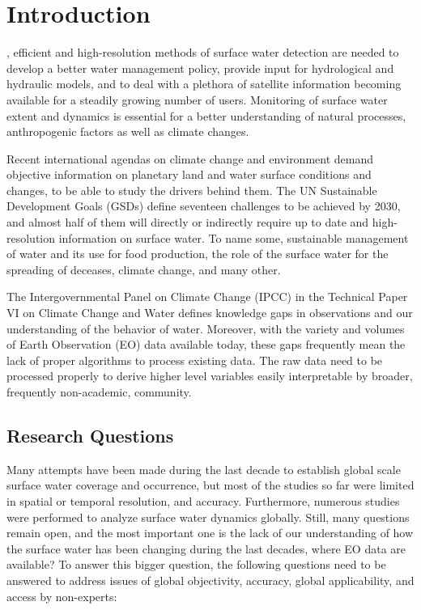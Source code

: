 \chapter{Introduction}

\label{intro}

, efficient and high-resolution methods of surface water detection are needed to develop a better water management policy, provide input for hydrological and hydraulic models, and to deal with a plethora of satellite information becoming available for a steadily growing number of users. Monitoring of surface water extent and dynamics is essential for a better understanding of natural processes, anthropogenic factors as well as climate changes. 

Recent international agendas on climate change and environment demand objective information on planetary land and water surface conditions and changes, to be able to study the drivers behind them. The UN Sustainable Development Goals (GSDs) define seventeen challenges to be achieved by 2030, and almost half of them will directly or indirectly require up to date and high-resolution information on surface water. To name some, sustainable management of water and its use for food production, the role of the surface water for the spreading of deceases, climate change, and many other. 

The Intergovernmental Panel on Climate Change (IPCC) in the Technical Paper VI on Climate Change and Water defines knowledge gaps in observations and our understanding of the behavior of water. Moreover, with the variety and volumes of Earth Observation (EO) data available today, these gaps frequently mean the lack of proper algorithms to process existing data. The raw data need to be processed properly to derive higher level variables easily interpretable by broader, frequently non-academic, community. 

\section{Research Questions}

Many attempts have been made during the last decade to establish global scale surface water coverage and occurrence, but most of the studies so far were limited in spatial or temporal resolution, and accuracy. Furthermore, numerous studies were performed to analyze surface water dynamics globally. Still, many questions remain open, and the most important one is the lack of our understanding of how the surface water has been changing during the last decades, where EO data are available? To answer this bigger question, the following questions need to be answered to address issues of global objectivity, accuracy, global applicability, and access by non-experts: 

